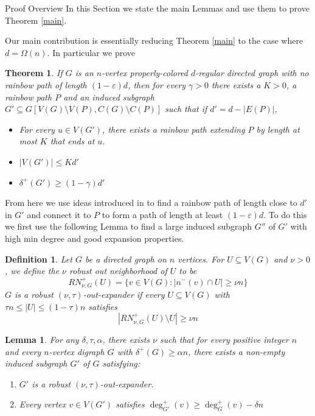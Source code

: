 \documentclass[11pt,a4paper]{article}
\newcounter{foo}
\newtheorem{theorem}{Theorem}
\newtheorem{lemma}[subsection]{Lemma}
\newtheorem{definition}[foo]{Definition}
\newcommand{\vep}{\varepsilon}
\begin{document}
\begin{section}{Proof Overview} \label{proof_overview}
In this Section we state the main Lemmas and use them to prove Theorem \ref{main}.

\medskip

Our main contribution is essentially reducing Theorem \ref{main} to the case where $d = \Omega(n)$. In particular we prove
\begin{theorem} \label{sec_1_main} If $G$ is an $n$-vertex properly-colored $d$-regular directed graph with no rainbow path of length $(1 - \vep)d$, then for every $\gamma > 0$ there exists a $K > 0$, a rainbow path $P$ and an induced subgraph $G' \subseteq G [ V(G) \setminus V(P), C(G) \setminus C(P) ]$ such that if $d' = d - |E(P)|$,
\begin{itemize}
	\item For every $u \in V(G')$, there exists a rainbow path extending $P$ by length at most $K$ that ends at $u$.
	\item $|V(G')| \leq K d'$
	\item $\delta^+(G') \geq (1 - \gamma) d'$
\end{itemize}
\end{theorem}
From here we use ideas introduced in \cite{BFMPY} to find a rainbow path of length close to $d'$ in $G'$ and connect it to $P$ to form a path of length at least $(1 - \vep) d$. To do this we first use the following Lemma to find a large induced subgraph $G''$ of $G'$ with high min degree and good expansion properties.
\begin{definition} Let $G$ be a directed graph on $n$ vertices. For $U \subseteq V(G)$ and $\nu > 0$, we define the $\nu$ robust out neighborhood of $U$ to be
\[
RN^{+}_{\nu, G}(U) = \{ v \in V(G) : |n^{-}(v) \cap U| \geq \nu n \}
\]
$G$ is a robust $(\nu, \tau)$-out-expander if every $U \subseteq V(G)$ with $\tau n \leq |U| \leq (1 - \tau) n$ satisfies
\[
|RN^{+}_{\nu, G} (U) \setminus U | \geq \nu n
\]
\end{definition}
\begin{lemma} \label{expander_finder} For any $\delta, \tau, \alpha$, there exists $\nu$ such that for every positive integer $n$ and every $n$-vertex digraph $G$ with $\delta^{+}(G) \geq \alpha n$, there exists a non-empty induced subgraph $G'$ of $G$ satisfying:
\begin{enumerate}
\item[\textbf{A1}] $G'$ is a robust $(\nu, \tau)$-out-expander.
\item[\textbf{A2}] Every vertex $v \in V(G')$ satisfies $\deg^{+}_{G'}(v) \geq \deg^+_{G}(v) - \delta n$

\end{enumerate}
\end{lemma}
\end{section}
\end{document}
